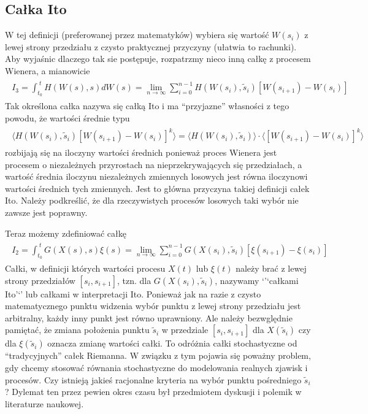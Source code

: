 \documentclass[a4paper,12pt,polish]{sphinxmanual}
\begin{document}
\subsection{Całka Ito}
\label{ch3/chIII011:calka-ito}
W tej definicji (preferowanej przez matematyków) wybiera się wartość $W(s_i)$ z lewej strony przedziału z czysto praktycznej przyczyny (ułatwia to rachunki). Aby wyjaśnic dlaczego tak sie postępuje, rozpatrzmy nieco inną całkę z procesem Wienera, a mianowicie
\label{ch3/chIII011:equation-eqn20}\begin{gather}
\begin{split}I_3= \int_{t_0}^{\;t} H(W(s), s) dW(s) = \lim_{n \to \infty} \sum_{i=0}^{n-1} H(W(s_i), {\tilde s}_i) [W(s_{i+1}) -W(s_i)]\end{split}\label{ch3/chIII011-eqn20}
\end{gather}
Tak określona całka nazywa się całką Ito i ma ``przyjazne'' własności z tego powodu, że wartości średnie typu
\label{ch3/chIII011:equation-eqn21}\begin{gather}
\begin{split} \langle H(W(s_i), {\tilde s}_i) [W(s_{i+1}) -W(s_i)]^k\rangle = \langle H(W(s_i), {\tilde s}_i)\rangle \cdot \langle [W(s_{i+1}) -W(s_i)]^k\rangle\end{split}\label{ch3/chIII011-eqn21}
\end{gather}
rozbijają się na iloczyny wartości średnich ponieważ proces Wienera jest procesem o niezależnych przyrostach na nieprzekrywających się przedziałach, a wartość średnia iloczynu niezależnych zmiennych losowych jest równa iloczynowi wartości średnich tych zmiennych. Jest to główna przyczyna takiej definicji całek Ito. Należy podkreślić, że dla rzeczywistych procesów losowych taki wybór nie zawsze jest poprawny.

Teraz możemy zdefiniować całkę
\label{ch3/chIII011:equation-eqn22}\begin{gather}
\begin{split}I_2=\int_{t_0}^{\;t} G(X(s), s) \xi(s) = \lim_{n \to \infty} \sum_{i=0}^{n-1} G(X(s_i), {\tilde s}_i) [\xi(s_{i+1}) -\xi(s_i)]\end{split}\label{ch3/chIII011-eqn22}
\end{gather}
Całki, w definicji których wartości procesu $X(t)$ lub $\xi(t)$ należy brać z lewej strony przedziałów $[s_i, s_{i+1}]$, tzn. dla $G(X(s_i), {\tilde s}_i)$, nazywamy `'`całkami Ito'`' lub całkami w interpretacji Ito. Ponieważ jak na razie z czysto matematycznego punktu widzenia wybór punktu z lewej strony przedziału jest arbitralny, każdy inny punkt jest równo uprawniony. Ale należy bezwględnie pamiętać, że zmiana położenia punktu ${\tilde s}_i$ w przedziale $[s_i, s_{i+1}]$ dla $X(\tilde s_i)$ czy dla $\xi(\tilde s_i)$ oznacza zmianę wartości całki. To odróżnia całki stochastyczne od ``tradycyjnych'' całek Riemanna. W związku z tym pojawia się poważny problem, gdy chcemy stosować równania stochastyczne do modelowania realnych zjawisk i procesów. Czy istnieją jakieś racjonalne kryteria na wybór punktu pośredniego $\tilde s_i$? Dylemat ten przez pewien okres czasu był przedmiotem dyskusji i polemik w literaturze naukowej.
\end{document}

